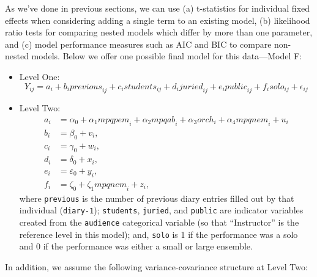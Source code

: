 \documentclass[
]{krantz}
\providecommand{\tightlist}{%
  \setlength{\itemsep}{0pt}\setlength{\parskip}{0pt}}
\begin{document}
As we've done in previous sections, we can use (a) t-statistics for individual fixed effects when considering adding a single term to an existing model, (b) likelihood ratio tests for comparing nested models which differ by more than one parameter, and (c) model performance measures such as AIC and BIC to compare non-nested models. Below we offer one possible final model for this data---Model F:

\begin{itemize}
\tightlist
\item
  Level One:
  \begin{equation}
  Y_{ij} = a_{i}+b_{i}\textstyle{previous}_{ij}+c_{i}\textstyle{students}_{ij}+
  d_{i}\textstyle{juried}_{ij}+e_{i}\textstyle{public}_{ij}+f_{i}\textstyle{solo}_{ij}+\epsilon_{ij}
  \label{eq:level1modelf}
  \end{equation}
\item
  Level Two:
  \begin{align*}
  a_{i} & = \alpha_{0}+\alpha_{1}\textstyle{mpqpem}_{i}+\alpha_{2}\textstyle{mpqab}_{i} + \alpha_{3}\textstyle{orch}_{i}+\alpha_{4}\textstyle{mpqnem}_{i}+u_{i} \\
  b_{i} & = \beta_{0}+v_{i}, \\
  c_{i} & = \gamma_{0}+w_{i}, \\
  d_{i} & = \delta_{0}+x_{i}, \\
  e_{i} & = \varepsilon_{0}+y_{i}, \\
  f_{i} & = \zeta_{0}+\zeta_{1}\textstyle{mpqnem}_{i}+z_{i},
  \end{align*}
  where \texttt{previous} is the number of previous diary entries filled out by that individual (\texttt{diary-1}); \texttt{students}, \texttt{juried}, and \texttt{public} are indicator variables created from the \texttt{audience} categorical variable (so that ``Instructor'' is the reference level in this model); and, \texttt{solo} is 1 if the performance was a solo and 0 if the performance was either a small or large ensemble.
\end{itemize}

In addition, we assume the following variance-covariance structure at Level Two:
\end{document}
